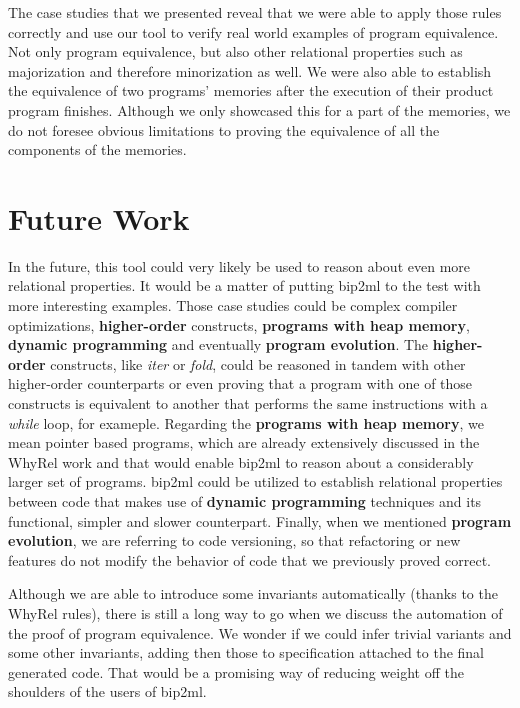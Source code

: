 The case studies that we presented reveal that we were able to apply those rules correctly and use our tool to verify real world examples of program equivalence.
Not only program equivalence, but also other relational properties such as majorization and therefore minorization as well.
We were also able to establish the equivalence of two programs' memories after the execution of their product program finishes.
Although we only showcased this for a part of the memories, we do not foresee obvious limitations to proving the equivalence of all the components of the memories.


\section{Future Work}
\label{sec:future}

In the future, this tool could very likely be used to reason about even more relational properties.
It would be a matter of putting bip2ml to the test with more interesting examples.
Those case studies could be complex compiler optimizations, \textbf{higher-order} constructs, \textbf{programs with heap memory}, \textbf{dynamic programming} and eventually \textbf{program evolution}.
The \textbf{higher-order} constructs, like \emph{iter} or \emph{fold}, could be reasoned in tandem with other higher-order counterparts or even proving that a program with one of those constructs is equivalent to another that performs the same instructions with a \emph{while} loop, for exameple. 
Regarding the \textbf{programs with heap memory}, we mean pointer based programs, which are already extensively discussed in the WhyRel work and that would enable bip2ml to reason about a considerably larger set of programs.
bip2ml could be utilized to establish relational properties between code that makes use of \textbf{dynamic programming} techniques and its functional, simpler and slower counterpart.
Finally, when we mentioned \textbf{program evolution}, we are referring to code versioning, so that refactoring or new features do not modify the behavior of code that we previously proved correct.

Although we are able to introduce some invariants automatically (thanks to the WhyRel rules), there is still a long way to go when we discuss the automation of the proof of program equivalence.
We wonder if we could infer trivial variants and some other invariants, adding then those to specification attached to the final generated code.
That would be a promising way of reducing weight off the shoulders of the users of bip2ml.
